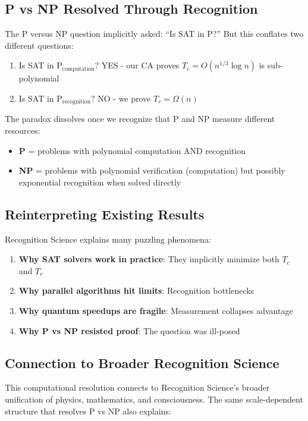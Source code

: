 \documentclass[11pt]{article}
\theoremstyle{plain}
\theoremstyle{definition}
\theoremstyle{remark}
\begin{document}
\subsection{P vs NP Resolved Through Recognition}

The P versus NP question implicitly asked: ``Is SAT in P?'' But this conflates two different questions:

\begin{enumerate}
\item Is SAT in $\text{P}_{\text{computation}}$? YES - our CA proves $T_c = O(n^{1/3} \log n)$ is sub-polynomial
\item Is SAT in $\text{P}_{\text{recognition}}$? NO - we prove $T_r = \Omega(n)$
\end{enumerate}

The paradox dissolves once we recognize that P and NP measure different resources:
\begin{itemize}
\item \textbf{P} = problems with polynomial computation AND recognition
\item \textbf{NP} = problems with polynomial verification (computation) but possibly exponential recognition when solved directly
\end{itemize}

\subsection{Reinterpreting Existing Results}

Recognition Science explains many puzzling phenomena:

\begin{enumerate}
\item \textbf{Why SAT solvers work in practice}: They implicitly minimize both $T_c$ and $T_r$
\item \textbf{Why parallel algorithms hit limits}: Recognition bottlenecks
\item \textbf{Why quantum speedups are fragile}: Measurement collapses advantage
\item \textbf{Why P vs NP resisted proof}: The question was ill-posed
\end{enumerate}

\subsection{Connection to Broader Recognition Science}

This computational resolution connects to Recognition Science's broader unification of physics, mathematics, and consciousness. The same scale-dependent structure that resolves P vs NP also explains:
\end{document}
